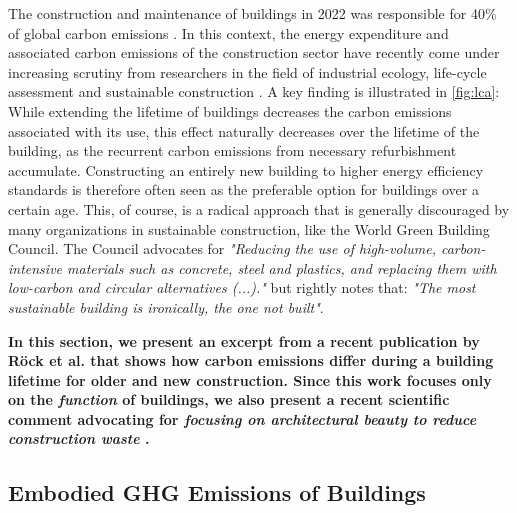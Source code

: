 \documentclass[a4paper]{article}
\begin{document}
\begin{mdframed}[linewidth=1pt, roundcorner=5pt, innerleftmargin=10pt, innerrightmargin=10pt, innertopmargin=10pt, innerbottommargin=10pt, linecolor=black, backgroundcolor=white, userdefinedwidth=\textwidth]
    The construction and maintenance of buildings in 2022 was responsible for 40\% of global carbon emissions \cite{camarasa_energy_2023}. In this context, the energy expenditure and associated carbon emissions of the construction sector have recently come under increasing scrutiny from researchers in the field of industrial ecology, life-cycle assessment and sustainable construction \cite{chau_review_2015}\cite{ortiz_sustainability_2009}. A key finding is illustrated in \cref{fig:lca}: While extending the lifetime of buildings decreases the carbon emissions associated with its use, this effect naturally decreases over the lifetime of the building, as the recurrent carbon emissions from necessary refurbishment accumulate. Constructing an entirely new building to higher energy efficiency standards is therefore often seen as the preferable option for buildings over a certain age. This, of course, is a radical approach that is generally discouraged by many organizations in sustainable construction, like the World Green Building Council. The Council advocates for \textit{"Reducing the use of high-volume, carbon-intensive materials such as concrete, steel and plastics, and replacing them with low-carbon and circular alternatives (...)."} \cite[Sec. 7.4]{noauthor_2022_2022} but rightly notes that: \textit{"The most sustainable building is ironically, the one not built"}.
    
    \textbf{In this section, we present an excerpt from a recent publication by Röck et al. \cite{rock_embodied_2020} that shows how carbon emissions differ during a building lifetime for older and new construction. Since this work focuses only on the \textit{function} of buildings, we also present a recent scientific comment advocating for \textit{focusing on architectural beauty to reduce construction waste} \cite{piotrowski_focusing_2024}.}
\end{mdframed}

\subsection{Embodied GHG Emissions of Buildings}
\end{document}
